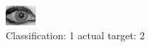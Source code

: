 \begin{figure}[h!]
\begin{center}
\includegraphics[width=0.60\columnwidth]{figures/ID1986_class_1_target_2.png}
\end{center}
\caption{ Classification: 1 actual target: 2}
\label{fig:ID1986_class_1_target_2}
\end{figure}
